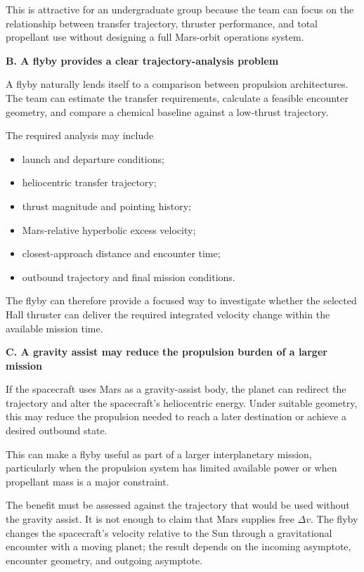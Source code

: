 This is attractive for an undergraduate group because the
team can focus on the relationship between transfer trajectory,
thruster performance, and total propellant use without designing
a full Mars-orbit operations system.

\textbf{B. A flyby provides a clear trajectory-analysis problem}

A flyby naturally lends itself to a comparison between
propulsion architectures. The team can estimate the transfer
requirements, calculate a feasible encounter geometry, and
compare a chemical baseline against a low-thrust trajectory.

The required analysis may include

\begin{itemize}
	\item launch and departure conditions;
	\item heliocentric transfer trajectory;
	\item thrust magnitude and pointing history;
	\item Mars-relative hyperbolic excess velocity;
	\item closest-approach distance and encounter time;
	\item outbound trajectory and final mission conditions.
\end{itemize}

The flyby can therefore provide a focused way to investigate
whether the selected Hall thruster can deliver the required
integrated velocity change within the available mission time.

\textbf{C. A gravity assist may reduce the propulsion
	burden of a larger mission}

If the spacecraft uses Mars as a gravity-assist body, the
planet can redirect the trajectory and alter the spacecraft's
heliocentric energy. Under suitable geometry, this may reduce
the propulsion needed to reach a later destination or achieve
a desired outbound state.

This can make a flyby useful as part of a larger interplanetary
mission, particularly when the propulsion system has limited
available power or when propellant mass is a major constraint.

The benefit must be assessed against the trajectory that would
be used without the gravity assist. It is not enough to claim
that Mars supplies free \(\Delta v\). The flyby changes the
spacecraft's velocity relative to the Sun through a gravitational
encounter with a moving planet; the result depends on the
incoming asymptote, encounter geometry, and outgoing asymptote.

